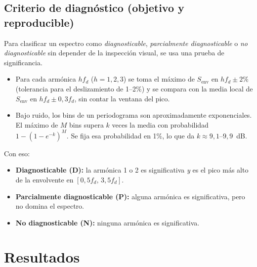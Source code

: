 \documentclass[11pt,a4paper]{article}
\begin{document}
\subsection{Criterio de diagnóstico (objetivo y reproducible)}\label{sec:criterio}
Para clasificar un espectro como \emph{diagnosticable}, \emph{parcialmente diagnosticable} o \emph{no diagnosticable} sin depender de la inspección visual, se usa una prueba de significancia.
\begin{itemize}[itemsep=1pt]
\item Para cada armónica $h f_d$ ($h=1,2,3$) se toma el máximo de $S_{\mathrm{env}}$ en $h f_d\pm2\%$ (tolerancia para el deslizamiento de 1--2\%) y se compara con la media local de $S_{\mathrm{env}}$ en $h f_d\pm0{,}3f_d$, sin contar la ventana del pico.
\item Bajo ruido, los bins de un periodograma son aproximadamente exponenciales. El máximo de $M$ bins supera $k$ veces la media con probabilidad $1-(1-e^{-k})^M$. Se fija esa probabilidad en 1\%, lo que da $k\approx 9{,}1$--$9{,}9$~dB.
\end{itemize}
Con eso:
\begin{itemize}[itemsep=1pt]
\item \textbf{Diagnosticable (D):} la armónica 1 o 2 es significativa \emph{y} es el pico más alto de la envolvente en $[0{,}5f_d,\,3{,}5f_d]$.
\item \textbf{Parcialmente diagnosticable (P):} alguna armónica es significativa, pero no domina el espectro.
\item \textbf{No diagnosticable (N):} ninguna armónica es significativa.
\end{itemize}

\section{Resultados}
\end{document}
